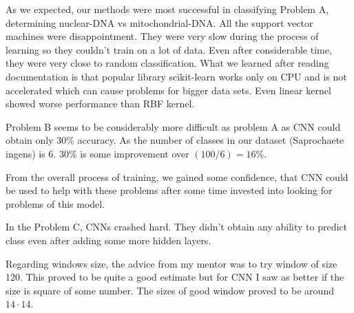 As we expected, our methods were most successful in classifying Problem A, determining
nuclear-DNA vs mitochondrial-DNA. All the support vector machines were disappointment.
They were very slow during the process of learning so they couldn't train on a lot of
data. Even after considerable time, they were very close to random classification.
What we learned after reading documentation is that popular library scikit-learn
works only on CPU and is not accelerated which can cause problems for bigger data
sets. Even linear kernel showed worse performance than RBF kernel.

\medskip

Problem B seems to be considerably more difficult as problem A as CNN could obtain
only 30\% accuracy. As the number of classes in our dataset (Saprochaete ingens)
is 6. 30\% is some improvement over $(100/6)=16\%$.

From the overall process of training, we gained some confidence, that CNN could
be used to help with these problems after some time invested into looking for
problems of this model.

\medskip

In the Problem C, CNNs crashed hard. They didn't obtain any ability to predict
class even after adding some more hidden layers.

\medskip

Regarding windows size, the advice from my mentor was to try window of size 120.
This proved to be quite a good estimate but for CNN I saw as better if the size
is square of some number. The sizes of good window proved to be around $14\cdot 14$.
